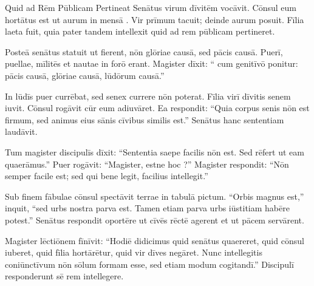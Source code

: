 \documentclass[12pt]{nextbook}
\begin{document}
\begin{readersection}{Quid ad Rēm Pūblicam Pertineat}
Senātus virum dīvitēm vocāvit. Cōnsul eum hortātus est ut aurum in mensā . Vir prīmum tacuit; deinde aurum posuit. Fīlia laeta fuit, quia pater tandem intellexit quid ad rem pūblicam pertineret.

Posteā senātus statuit ut  fierent, nōn glōriae causā, sed pācis causā. Puerī, puellae, mīlitēs et nautae in forō erant. Magister dīxit: “ cum genitīvō ponitur: pācis causā, glōriae causā, lūdōrum causā.”

In lūdīs puer  currēbat, sed senex currere nōn poterat. Fīlia virī dīvitis senem iuvit. Cōnsul rogāvit cūr eum adiuvāret. Ea respondit: “Quia corpus senis nōn est firmum, sed animus eius sānis cīvibus similis est.” Senātus hanc sententiam laudāvit.

Tum magister discipulīs dīxit: “Sententia  saepe facilis nōn est. Sed rēfert ut eam quaerāmus.” Puer rogāvit: “Magister, estne hoc ?” Magister respondit: “Nōn semper facile est; sed qui bene legit, facilius intellegit.”

Sub finem fābulae cōnsul spectāvit  terrae in tabulā pictum. “Orbis magnus est,” inquit, “sed urbs nostra parva est. Tamen etiam parva urbs iūstitiam habēre potest.” Senātus respondit oportēre ut cīvēs rēctē agerent et ut pācem servārent.

Magister lēctiōnem fīnīvit: “Hodiē didicimus quid senātus quaereret, quid cōnsul iuberet, quid fīlia hortārētur, quid vir dīves negāret. Nunc intellegitis coniūnctīvum nōn sōlum formam esse, sed etiam modum cogitandī.” Discipulī responderunt sē rem intellegere.

\end{readersection}
\end{document}
